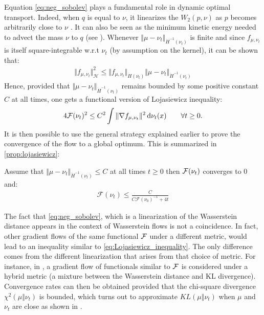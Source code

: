Equation \cref{eq:neg_sobolev} plays a fundamental role in dynamic optimal transport. Indeed, when $q$ is equal to $\nu$, it linearizes the $W_2(p,\nu)$ as $p$ becomes arbitrarily close to $\nu$ \cite{Villani:2009,Otto:2000,Peyre:2011}. It can also be seen as the minimum kinetic energy needed to advect the mass $\nu$ to $q$ (see \cite{mroueh2018regularized}). Whenever $\Vert \mu - \nu_t \Vert_{\dot{H}^{-1}(\nu_t)} $ is finite and since $f_{\mu,\nu_t}$ is itself square-integrable w.r.t $\nu_t$ (by assumption on the kernel), it can be shown that:
\begin{align}\label{eq:inequality_neg_sobolev}
	\Vert f_{\mu,\nu_t} \Vert^2_{\mathcal{H}} \leq \Vert f_{\mu,\nu_t} \Vert_{\dot{H}(\nu_t)} \Vert  \mu -\nu_t\Vert_{\dot{H}^{-1}(\nu_t)}  
\end{align}
Hence, provided that $\Vert \mu - \nu_t \Vert_{\dot{H}^{-1}(\nu_t)} $ remains bounded by some positive constant $C$ at all times, one gets a functional version of Lojasiewicz inequality:
\begin{align}\label{eq:Lojasiewicz_inequality}
	4{{\mathcal F}}(\nu_t)^2\leq C^2 \int \Vert \nabla f_{\mu,\nu_t} \Vert^2 \mathop{}\!\mathrm{d} \nu_t(x)  \qquad \forall t\geq 0.
\end{align} 
It is then possible to use the general strategy explained earlier to prove the convergence of the flow to a global optimum. This is summarized in \cref{prop:lojasiewicz}:
\begin{proposition}\label{prop:lojasiewicz}
	Assume that $\Vert \mu - \nu_t \Vert_{\dot{H}^{-1}(\nu_t)} \leq C$ at all times $t\geq 0$ then ${{\mathcal F}}(\nu_t)$ converges to $0$ and:
	\begin{align}
	\mathcal{F}(\nu_t)\leq \frac{C}{C\mathcal{F}(\nu_0)^{-1} + 4t}
	\end{align}
\end{proposition}
The fact that \cref{eq:neg_sobolev}, which is a linearization of the Wasserstein distance appears in the context of Wasserstein flows is not a coincidence. In fact, other gradient flows of the same functional ${{\mathcal F}}$ under a different metric, would lead to an inequality similar to \cref{eq:Lojasiewicz_inequality}. The only difference comes from the different linearization that arises from that choice of metric. For instance, in \cite{Rotskoff:2019}, a gradient flow of functionals similar to ${{\mathcal F}}$ is considered under a hybrid metric (a mixture between the Wasserstein distance and KL divergence). Convergence rates can then be obtained provided that the chi-square divergence $\chi^2(\mu\Vert \nu_t)$ is bounded, which turns out to approximate $KL(\mu\Vert \nu_t)$ when $\mu$ and $\nu_t$ are close as shown in .

